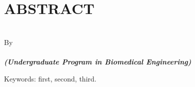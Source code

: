 \clearpage
\chapter*{ABSTRACT}

\begin{center}
	
	\linespread{1}
	\large{\bfseries \MakeUppercase{\thetitle}}
	\\[\baselineskip]
	
	\normalsize{By\\}
	\large{ 
		\bfseries \theauthor\\
		\itshape (Undergraduate Program in Biomedical Engineering)
	}
	\\[2\baselineskip]
	
\end{center}

\begin{itshape}

\blindtext

Keywords: first, second, third.

\end{itshape}

\clearpage


